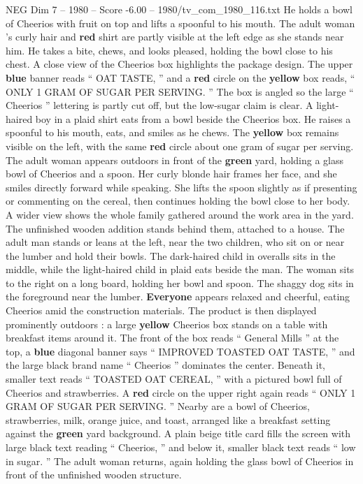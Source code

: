 \begin{textsample}{NEG Dim 7 – 1980 – Score -6.00 – 1980/tv\_com\_1980\_116.txt}
He holds a bowl of Cheerios with fruit on top and lifts a spoonful to his mouth.
The adult woman ’s curly hair and \textbf{red} shirt are partly visible at the left edge as she stands near him.
He takes a bite, chews, and looks pleased, holding the bowl close to his chest.
A close view of the Cheerios box highlights the package design.
The upper \textbf{blue} banner reads “ OAT TASTE, ” and a \textbf{red} circle on the \textbf{yellow} box reads, “ ONLY 1 GRAM OF SUGAR PER SERVING. ” The box is angled so the large “ Cheerios ” lettering is partly cut off, but the low-sugar claim is clear.
A light-haired boy in a plaid shirt eats from a bowl beside the Cheerios box.
He raises a spoonful to his mouth, eats, and smiles as he chews.
The \textbf{yellow} box remains visible on the left, with the same \textbf{red} circle about one gram of sugar per serving.
The adult woman appears outdoors in front of the \textbf{green} yard, holding a glass bowl of Cheerios and a spoon.
Her curly blonde hair frames her face, and she smiles directly forward while speaking.
She lifts the spoon slightly as if presenting or commenting on the cereal, then continues holding the bowl close to her body.
A wider view shows the whole family gathered around the work area in the yard.
The unfinished wooden addition stands behind them, attached to a house.
The adult man stands or leans at the left, near the two children, who sit on or near the lumber and hold their bowls.
The dark-haired child in overalls sits in the middle, while the light-haired child in plaid eats beside the man.
The woman sits to the right on a long board, holding her bowl and spoon.
The shaggy dog sits in the foreground near the lumber. \textbf{Everyone} appears relaxed and cheerful, eating Cheerios amid the construction materials.
The product is then displayed prominently outdoors : a large \textbf{yellow} Cheerios box stands on a table with breakfast items around it.
The front of the box reads “ General Mills ” at the top, a \textbf{blue} diagonal banner says “ IMPROVED TOASTED OAT TASTE, ” and the large black brand name “ Cheerios ” dominates the center.
Beneath it, smaller text reads “ TOASTED OAT CEREAL, ” with a pictured bowl full of Cheerios and strawberries.
A \textbf{red} circle on the upper right again reads “ ONLY 1 GRAM OF SUGAR PER SERVING. ” Nearby are a bowl of Cheerios, strawberries, milk, orange juice, and toast, arranged like a breakfast setting against the \textbf{green} yard background.
A plain beige title card fills the screen with large black text reading “ Cheerios, ” and below it, smaller black text reads “ low in sugar. ” The adult woman returns, again holding the glass bowl of Cheerios in front of the unfinished wooden structure.

\end{textsample}
